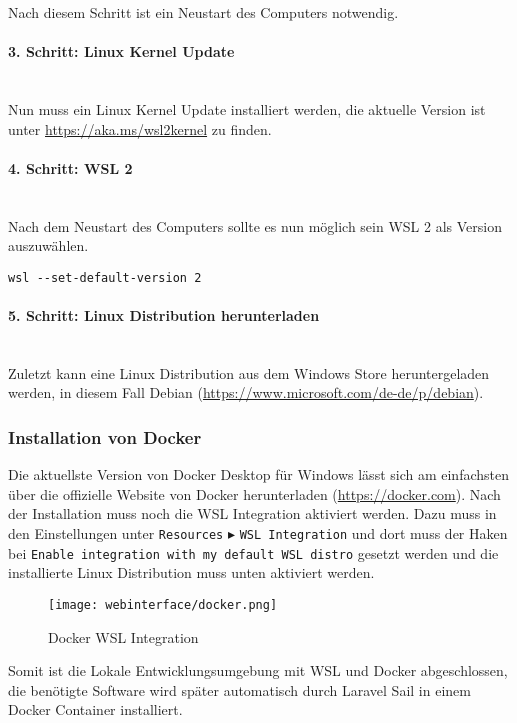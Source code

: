Nach diesem Schritt ist ein Neustart des Computers notwendig.

\paragraph{3. Schritt: Linux Kernel Update}\mbox{}\\
Nun muss ein Linux Kernel Update installiert werden, die aktuelle Version ist
unter \url{https://aka.ms/wsl2kernel} zu finden.

\paragraph{4. Schritt: WSL 2}\mbox{}\\
Nach dem Neustart des Computers sollte es nun möglich sein WSL 2 als Version
auszuwählen.
\begin{lstlisting}[caption={WSL 2 auswählen}]
  wsl --set-default-version 2
\end{lstlisting}

\paragraph{5. Schritt: Linux Distribution herunterladen}\mbox{}\\
Zuletzt kann eine Linux Distribution aus dem Windows Store heruntergeladen
werden, in diesem Fall Debian (\url{https://www.microsoft.com/de-de/p/debian}).

\subsubsection{Installation von Docker}
Die aktuellste Version von Docker Desktop für Windows lässt sich am einfachsten
über die offizielle Website von Docker herunterladen (\url{https://docker.com}).
Nach der Installation muss noch die WSL Integration aktiviert werden. Dazu muss
in den Einstellungen unter \verb|Resources| $\blacktriangleright$ \verb|WSL Integration| und
dort muss der Haken bei \verb|Enable integration with my default WSL distro| gesetzt
werden und die installierte Linux Distribution muss unten aktiviert werden.

\begin{figure}[H]
  \centering
  \texttt{[image: webinterface/docker.png]}
  \caption{Docker WSL Integration}
\end{figure}

Somit ist die Lokale Entwicklungsumgebung mit WSL und Docker abgeschlossen, die
benötigte Software wird später automatisch durch Laravel Sail in einem Docker
Container installiert.


